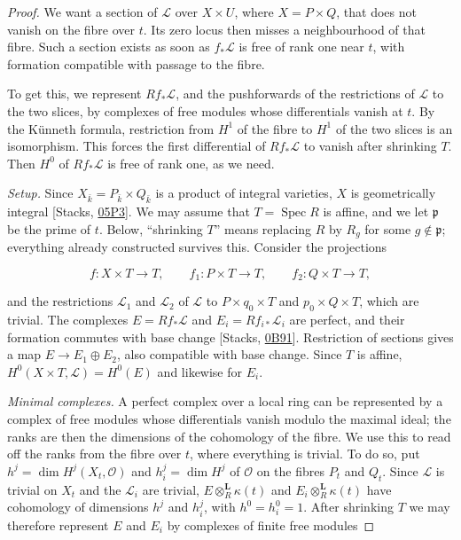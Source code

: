 \documentclass[11pt]{article}
\begin{document}
\begin{proof}[{Proof}]\label{bp15}%
We want a section of \(\mathcal L\) over \(X\times U\), where \(X=P\times Q\), that does not vanish on the fibre over \(t\). Its zero locus then misses a neighbourhood of that fibre. Such a section exists as soon as \(f_*\mathcal L\) is free of rank one near \(t\), with formation compatible with passage to the fibre.

To get this, we represent \(Rf_*\mathcal L\), and the pushforwards of the restrictions of \(\mathcal L\) to the two slices, by complexes of free modules whose differentials vanish at \(t\). By the Künneth formula, restriction from \(H^1\) of the fibre to \(H^1\) of the two slices is an isomorphism. This forces the first differential of \(Rf_*\mathcal L\) to vanish after shrinking \(T\). Then \(H^0\) of \(Rf_*\mathcal L\) is free of rank one, as we need.

\emph{Setup.} Since \(X_{\bar k}=P_{\bar k}\times Q_{\bar k}\) is a product of integral varieties, \(X\) is geometrically integral [Stacks, \href{https://stacks.math.columbia.edu/tag/05P3}{05P3}]. We may assume that \(T=\operatorname{Spec}R\) is affine, and we let \(\mathfrak p\) be the prime of \(t\). Below, “shrinking \(T\)” means replacing \(R\) by \(R_g\) for some \(g\notin\mathfrak p\); everything already constructed survives this. Consider the projections

\[
f:X\times T\to T,\qquad f_1:P\times T\to T,\qquad f_2:Q\times T\to T,
\]

and the restrictions \(\mathcal L_1\) and \(\mathcal L_2\) of \(\mathcal L\) to \(P\times q_0\times T\) and \(p_0\times Q\times T\), which are trivial. The complexes \(E=Rf_*\mathcal L\) and \(E_i=Rf_{i*}\mathcal L_i\) are perfect, and their formation commutes with base change [Stacks, \href{https://stacks.math.columbia.edu/tag/0B91}{0B91}]. Restriction of sections gives a map \(E\to E_1\oplus E_2\), also compatible with base change. Since \(T\) is affine, \(H^0(X\times T,\mathcal L)=H^0(E)\) and likewise for \(E_i\).

\emph{Minimal complexes.} A perfect complex over a local ring can be represented by a complex of free modules whose differentials vanish modulo the maximal ideal; the ranks are then the dimensions of the cohomology of the fibre. We use this to read off the ranks from the fibre over \(t\), where everything is trivial. To do so, put \(h^j=\dim H^j(X_t,\mathcal O)\) and \(h_i^j=\dim H^j\) of \(\mathcal O\) on the fibres \(P_t\) and \(Q_t\). Since \(\mathcal L\) is trivial on \(X_t\) and the \(\mathcal L_i\) are trivial, \(E\otimes^{\mathbf L}_R\kappa(t)\) and \(E_i\otimes^{\mathbf L}_R\kappa(t)\) have cohomology of dimensions \(h^j\) and \(h_i^j\), with \(h^0=h_i^0=1\). After shrinking \(T\) we may therefore represent \(E\) and \(E_i\) by complexes of finite free modules


\end{proof}
\end{document}
